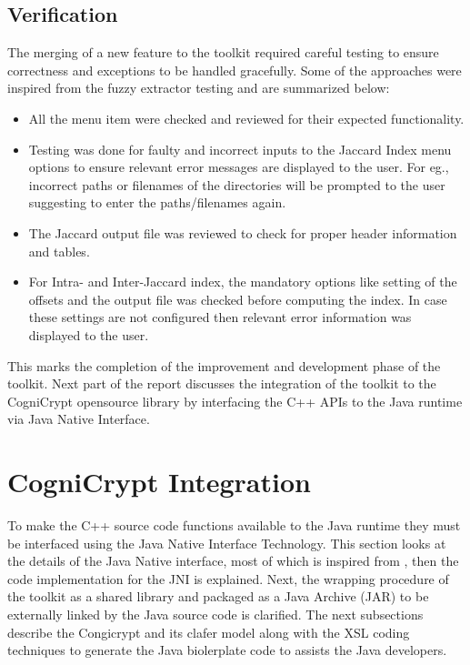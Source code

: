 \subsection{Verification}
The merging of a new feature to the toolkit required careful testing to ensure correctness and exceptions to be handled gracefully. Some of the approaches were inspired from the fuzzy extractor testing and are summarized below:
\begin{itemize}
	\item All the menu item were checked and reviewed for their expected functionality.
	\item Testing was done for faulty and incorrect inputs to the Jaccard Index menu options to ensure relevant error messages are displayed to the user. For eg., incorrect paths or filenames of the directories will be prompted to the user suggesting to enter the paths/filenames again.
	\item The Jaccard output file was reviewed to check for proper header information and tables.
	\item For Intra- and Inter-Jaccard index, the mandatory options like setting of the offsets and the output file was checked before computing the index. In case these settings are not configured then relevant error information was displayed to the user.
\end{itemize}

This marks the completion of the improvement and development phase of the toolkit. Next part of the report discusses the integration of the toolkit to the CogniCrypt opensource library by interfacing the C++ APIs to the Java runtime via Java Native Interface.

\section{CogniCrypt Integration}

To make the C++ source code functions available to the Java runtime they must be interfaced using the Java Native Interface Technology. This section looks at the details of the Java Native interface, most of which is inspired from \cite{jni}, then the code implementation for the JNI is explained. Next, the wrapping procedure of the toolkit as a shared library and packaged as a Java Archive (JAR) to be externally linked by the Java source code is clarified. The next subsections describe the Congicrypt and its clafer model
along with the XSL coding techniques to generate the Java biolerplate code to assists the Java developers.\\

